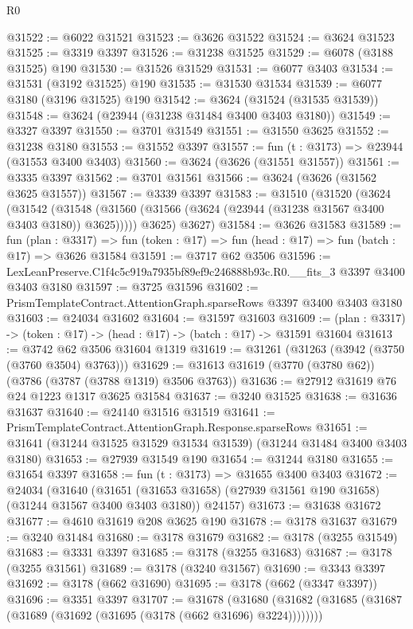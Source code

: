 \begin{lexlean}{R0}
\begin{coremodule}
@31522 := @6022 @31521
@31523 := @3626 @31522
@31524 := @3624 @31523
@31525 := @3319 @3397
@31526 := @31238 @31525
@31529 := @6078 (@3188 @31525) @190
@31530 := @31526 @31529
@31531 := @6077 @3403
@31534 := @31531 (@3192 @31525) @190
@31535 := @31530 @31534
@31539 := @6077 @3180 (@3196 @31525) @190
@31542 := @3624 (@31524 (@31535 @31539))
@31548 := @3624 (@23944 (@31238 @31484 @3400 @3403 @3180))
@31549 := @3327 @3397
@31550 := @3701 @31549
@31551 := @31550 @3625
@31552 := @31238 @3180
@31553 := @31552 @3397
@31557 := fun (t : @3173) => @23944 (@31553 @3400 @3403)
@31560 := @3624 (@3626 (@31551 @31557))
@31561 := @3335 @3397
@31562 := @3701 @31561
@31566 := @3624 (@3626 (@31562 @3625 @31557))
@31567 := @3339 @3397
@31583 := @31510
    (@31520
      (@3624
        (@31542 (@31548 (@31560 (@31566 (@3624 (@23944 (@31238 @31567 @3400 @3403 @3180)) @3625)))))
        @3625)
      @3627)
@31584 := @3626 @31583
@31589 := fun (plan : @3317) =>
  fun (token : @17) => fun (head : @17) => fun (batch : @17) => @3626 @31584
@31591 := @3717 @62 @3506
@31596 := LexLeanPreserve.C1f4c5c919a7935bf89ef9c246888b93c.R0.__fits_3 @3397 @3400 @3403 @3180
@31597 := @3725 @31596
@31602 := PrismTemplateContract.AttentionGraph.sparseRows @3397 @3400 @3403 @3180
@31603 := @24034 @31602
@31604 := @31597 @31603
@31609 := (plan : @3317) -> (token : @17) -> (head : @17) -> (batch : @17) -> @31591 @31604
@31613 := @3742 @62 @3506 @31604 @1319
@31619 := @31261 (@31263 (@3942 (@3750 (@3760 @3504) @3763)))
@31629 := @31613 @31619 (@3770 (@3780 @62)) (@3786 (@3787 (@3788 @1319) @3506 @3763))
@31636 := @27912 @31619 @76 @24 @1223 @1317 @3625 @31584
@31637 := @3240 @31525
@31638 := @31636 @31637
@31640 := @24140 @31516 @31519
@31641 := PrismTemplateContract.AttentionGraph.Response.sparseRows
@31651 := @31641 (@31244 @31525 @31529 @31534 @31539) (@31244 @31484 @3400 @3403 @3180)
@31653 := @27939 @31549 @190
@31654 := @31244 @3180
@31655 := @31654 @3397
@31658 := fun (t : @3173) => @31655 @3400 @3403
@31672 := @24034
    (@31640
      (@31651 (@31653 @31658) (@27939 @31561 @190 @31658) (@31244 @31567 @3400 @3403 @3180))
      @24157)
@31673 := @31638 @31672
@31677 := @4610 @31619 @208 @3625 @190
@31678 := @3178 @31637
@31679 := @3240 @31484
@31680 := @3178 @31679
@31682 := @3178 (@3255 @31549)
@31683 := @3331 @3397
@31685 := @3178 (@3255 @31683)
@31687 := @3178 (@3255 @31561)
@31689 := @3178 (@3240 @31567)
@31690 := @3343 @3397
@31692 := @3178 (@662 @31690)
@31695 := @3178 (@662 (@3347 @3397))
@31696 := @3351 @3397
@31707 := @31678
    (@31680 (@31682 (@31685 (@31687 (@31689 (@31692 (@31695 (@3178 (@662 @31696) @3224))))))))

\end{coremodule}
\end{lexlean}
